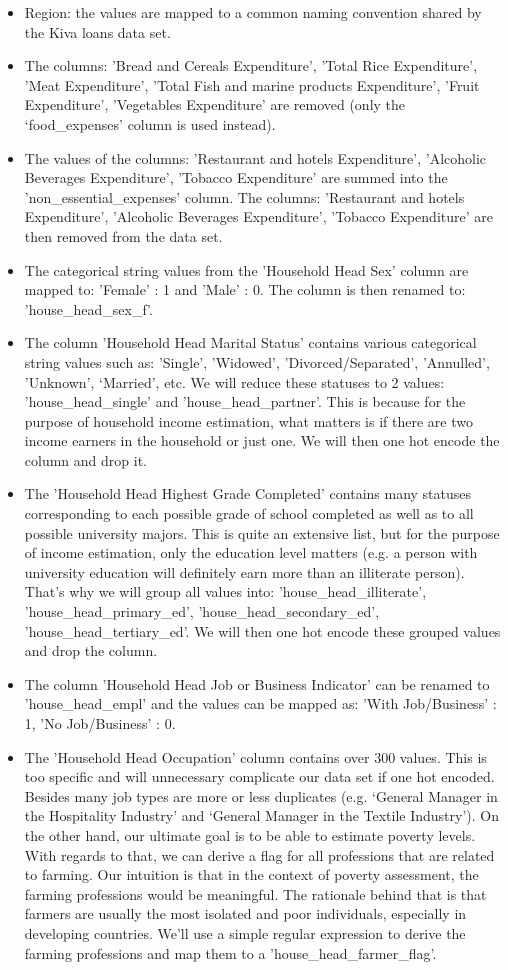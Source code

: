 \documentclass{article}
\begin{document}
\begin{itemize}
  \item Region: the values are mapped to a common naming convention shared by the Kiva loans data set.
  \item The columns: 'Bread and Cereals Expenditure', 'Total Rice Expenditure', 'Meat Expenditure', 'Total Fish and  marine products Expenditure', 'Fruit Expenditure', 'Vegetables Expenditure' are removed (only the ‘food\_expenses’ column is used instead).
  \item The values of the columns: 'Restaurant and hotels Expenditure', 'Alcoholic Beverages Expenditure', 'Tobacco Expenditure' are summed into the 'non\_essential\_expenses' column. The columns: 'Restaurant and hotels Expenditure', 'Alcoholic Beverages Expenditure', 'Tobacco Expenditure' are then removed from the data set.
  \item The categorical string values from the 'Household Head Sex' column are mapped to: 'Female' : 1 and 'Male' : 0. The column is then renamed to: 'house\_head\_sex\_f'.
  \item The column 'Household Head Marital Status' contains various categorical string values such as: 'Single', 'Widowed', 'Divorced/Separated', 'Annulled', 'Unknown', ‘Married’, etc. We will reduce these statuses to 2 values: 'house\_head\_single' and 'house\_head\_partner'. This is because for the purpose of household income estimation, what matters is if there are two income earners in the household or just one. We will then one hot encode the column and drop it.
  \item The 'Household Head Highest Grade Completed' contains many statuses corresponding to each possible grade of school completed as well as to all possible university majors. This is quite an extensive list, but for the purpose of income estimation, only the education level matters (e.g. a person with university education will definitely earn more than an illiterate person). That’s why we will group all values into: 'house\_head\_illiterate', 'house\_head\_primary\_ed', 'house\_head\_secondary\_ed', 'house\_head\_tertiary\_ed'. We will then one hot encode these grouped values and drop the column.
  \item The column 'Household Head Job or Business Indicator' can be renamed to 'house\_head\_empl' and the values can be mapped as: 'With Job/Business' : 1, 'No Job/Business' : 0.
  \item The 'Household Head Occupation' column contains over 300 values. This is too specific and will unnecessary complicate our data set if one hot encoded. Besides many job types are more or less duplicates (e.g. ‘General Manager in the Hospitality Industry’ and ‘General Manager in the Textile Industry’). On the other hand, our ultimate goal is to be able to estimate poverty levels. With regards to that, we can derive a flag for all professions that are related to farming. Our intuition is that in the context of poverty assessment, the farming professions would be meaningful. The rationale behind that is that farmers are usually the most isolated and poor individuals, especially in developing countries. We'll use a simple regular expression to derive the farming professions and map them to a 'house\_head\_farmer\_flag'.

\end{itemize}
\end{document}
